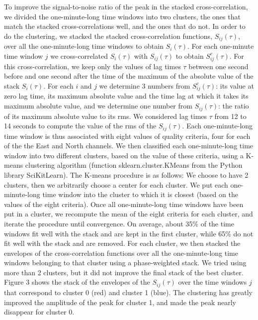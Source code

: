 \documentclass[draft]{agujournal2019}
\begin{document}
To improve the signal-to-noise ratio of the peak in the stacked cross-correlation, we divided the one-minute-long time windows into two clusters, the ones that match the stacked cross-correlations well, and the ones that do not. In order to do the clustering, we stacked the stacked cross-correlation functions, $S_{i j} (\tau)$, over all the one-minute-long time windows to obtain $S_i (\tau)$. For each one-minute time window $j$ we cross-correlated $S_i (\tau)$ with $S_{i j} (\tau)$ to obtain $S^c_{i j} (\tau)$. For this cross-correlation, we keep only the values of lag times $\tau$ between one second before and one second after the time of the maximum of the absolute value of the stack $S_i (\tau)$. For each $i$ and $j$ we determine 3 numbers from $S^c_{i j} (\tau)$: its value at zero lag time, its maximum absolute value and the time lag at which it takes its maximum absolute value, and we determine one number from $S_{i j} (\tau)$: the ratio of its maximum absolute value to its rms. We considered lag times $\tau$ from 12 to 14 seconds to compute the value of the rms of the $S_{i j} (\tau)$. Each one-minute-long time window is thus associated with eight values of quality criteria, four for each of the the East and North channels. We then classified each one-minute-long time window into two different clusters, based on the value of these criteria, using a K-means clustering algorithm (function sklearn.cluster.KMeans from the Python library SciKitLearn). The K-means procedure is as follows: We choose to have 2 clusters, then we arbitrarily choose a center for each cluster. We put each one-minute-long time window into the cluster to which it is closest (based on the values of the eight criteria). Once all one-minute-long time windows have been put in a cluster, we recompute the mean of the eight criteria for each cluster, and iterate the procedure until convergence. On average, about 35\% of the time windows fit well with the stack and are kept in the first cluster, while 65\% do not fit well with the stack and are removed. For each cluster, we then stacked the envelopes of the cross-correlation functions over all the one-minute-long time windows belonging to that cluster using a phase-weighted stack. We tried using more than 2 clusters, but it did not improve the final stack of the best cluster. Figure 3 shows the stack of the envelopes of the $S_{i j} (\tau)$ over the time windows $j$ that correspond to cluster 0 (red) and cluster 1 (blue).  The clustering has greatly improved the amplitude of the peak for cluster 1, and made the peak nearly disappear for cluster 0. \\
\end{document}
